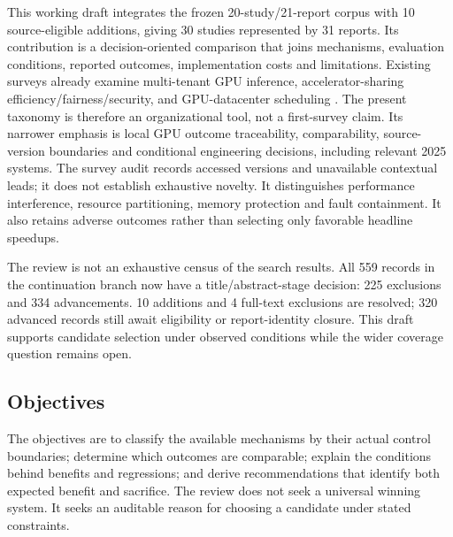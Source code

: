 This working draft integrates the frozen 20-study/21-report corpus with 10 source-eligible additions, giving 30 studies represented by 31 reports. Its contribution is a decision-oriented comparison that joins mechanisms, evaluation conditions, reported outcomes, implementation costs and limitations. Existing surveys already examine multi-tenant GPU inference, accelerator-sharing efficiency/fairness/security, and GPU-datacenter scheduling \cite{surveyYu,surveyHuang,surveyYe}. The present taxonomy is therefore an organizational tool, not a first-survey claim. Its narrower emphasis is local GPU outcome traceability, comparability, source-version boundaries and conditional engineering decisions, including relevant 2025 systems. The survey audit records accessed versions and unavailable contextual leads; it does not establish exhaustive novelty. It distinguishes performance interference, resource partitioning, memory protection and fault containment. It also retains adverse outcomes rather than selecting only favorable headline speedups.

The review is not an exhaustive census of the search results. All 559 records in the continuation branch now have a title/abstract-stage decision: 225 exclusions and 334 advancements. 10 additions and 4 full-text exclusions are resolved; 320 advanced records still await eligibility or report-identity closure. This draft supports candidate selection under observed conditions while the wider coverage question remains open.

\subsection{Objectives}
The objectives are to classify the available mechanisms by their actual control boundaries; determine which outcomes are comparable; explain the conditions behind benefits and regressions; and derive recommendations that identify both expected benefit and sacrifice. The review does not seek a universal winning system. It seeks an auditable reason for choosing a candidate under stated constraints.

